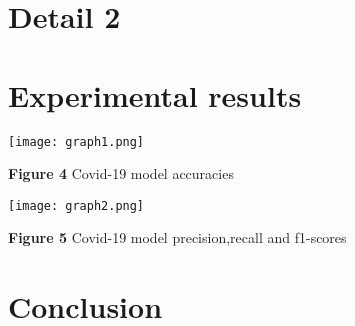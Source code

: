 \documentclass[journal]{IEEEtran}
\begin{document}
\section{Detail 2}
\label{SP}

\section{Experimental results}
\label{sec:ER}
\begin{center}
\texttt{[image: graph1.png]}
    \item{\footnotesize{\textbf {Figure 4} Covid-19 model accuracies}}
\end{center}
\begin{center}
\texttt{[image: graph2.png]}
    \item{\footnotesize{\textbf {Figure 5} Covid-19 model precision,recall and f1-scores}}
\end{center}
\section{Conclusion}
\label{Conclusion}





\vspace{-1cm}
\end{document}
